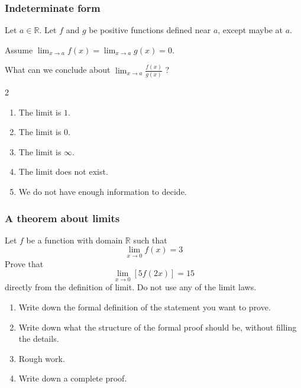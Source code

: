 \begin{frame}[t]
	\frametitle{Indeterminate form}

	Let $a \in \mathbb{R}$. Let $f$ and $g$ be positive functions defined near $a$,
	except maybe at $a$.

	\vfill

	Assume $\displaystyle \lim_{x \to a}f(x) = \lim_{x \to a}g(x) = 0$.

	\vfill

	What can we conclude about \quad
	$\displaystyle \lim_{x \to a}\frac{f(x)}{g(x)}$ ?

	\vfill

	\begin{multicols}{2}
		\begin{enumerate}
			\item The limit is $1$.

			\item The limit is $0$.

			\item The limit is $\infty$.

			\item The limit does not exist.

			\item We do not have enough information to decide.
		\end{enumerate}
	\end{multicols}
\end{frame}

\begin{frame}
	\frametitle{A theorem about limits}
	\fontsize{13}{13}\selectfont
	\begin{block}{}
		Let $f$ be a function with domain $\mathbb{R}$ such that
		\[
			\lim_{x\to 0}f(x) = 3
		\]
		Prove that
		\[
			\lim_{x\to 0}\left[ 5 f(2x) \right] =15
		\]
		directly from the definition of limit. Do not use any of the limit laws.
	\end{block}
	\begin{enumerate}

		\item Write down the formal definition of the statement you want to prove.

		\item Write down what the structure of the formal proof should be, without
			filling the details.

		\item Rough work.

		\item Write down a complete proof.
	\end{enumerate}
\end{frame}

